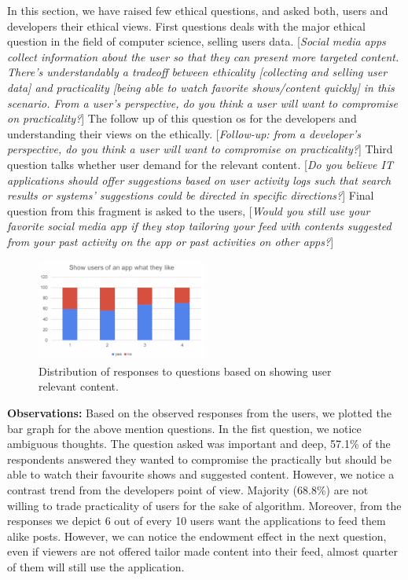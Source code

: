 \documentclass[conference]{IEEEtran}
\begin{document}
In this section, we have raised few ethical questions, and asked both, users and developers their ethical views. First questions deals with the major ethical question in the field of computer science, selling users data. [\textit{Social media apps collect information about the user so that they can present more targeted content. There’s understandably a tradeoff between ethicality [collecting and selling user data] and practicality [being able to watch favorite shows/content quickly] in this scenario. From a user’s perspective, do you think a user will want to compromise on practicality?}] The follow up of this question os for the developers and understanding their views on the ethically. [\textit{Follow-up: from a developer’s perspective, do you think a user will want to compromise on practicality?}] Third question talks whether user demand for the relevant content. [\textit{Do you believe IT applications should offer suggestions based on user activity logs such that search results or systems’ suggestions could be directed in specific directions?}] Final question from this fragment is asked to the users, [\textit{Would you still use your favorite social media app if they stop tailoring your feed with contents suggested from your past activity on the app or past activities on other apps?}]\

\begin{figure}[htbp]
\centerline{\includegraphics[width=0.5\textwidth]{Showing user relevant posts.png}}
\caption{Distribution of responses to questions based on showing user relevant content.}
\label{sr}
\end{figure}

\textbf{Observations:} 
Based on the observed responses from the users, we plotted the bar graph for the above mention questions. In the fist question, we notice ambiguous thoughts. The question asked was important and deep, 57.1\% of the respondents answered they wanted to compromise the practically but should be able to watch their favourite shows and suggested content. However, we notice a contrast trend from the developers point of view. Majority (68.8\%) are not willing to trade practicality of users for the sake of algorithm. Moreover, from the responses we depict 6 out of every 10 users want the applications to feed them alike posts. However, we can notice the endowment effect in the next question, even if viewers are not offered tailor made content into their feed, almost quarter of them will still use the application. 
\end{document}
